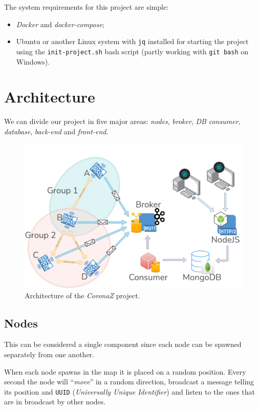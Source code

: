 \documentclass[conference]{IEEEtran}
\begin{document}
		The system requirements for this project are simple:
		\begin{itemize}
			\item \textit{Docker} and \textit{docker-compose};
			\item Ubuntu or another Linux system with \texttt{jq} installed for starting the project using the \texttt{init-project.sh} bash script (partly working with \texttt{git bash} on Windows).
		\end{itemize}

\section{Architecture}\label{sec:architecture}
	
	We can divide our project in five major areas: \textit{nodes}, \textit{broker}, \textit{DB consumer}, \textit{database}, \textit{back-end} and \textit{front-end}.

	\begin{figure}[htbp]
		\centerline{\includegraphics[width=\linewidth]{img/coronaz.png}}
		\caption{Architecture of the \textit{CoronaZ} project.}
		\label{fig:architecture}
	\end{figure}
	
	\subsection{Nodes}
	
		This can be considered a single component since each node can be spawned separately from one another.
		
		When each node spawns in the map it is placed on a random position.
		Every second the node will ``\textit{move}'' in a random direction, broadcast a message telling its position and \texttt{UUID} (\textit{Universally Unique Identifier}) and listen to the ones that are in broadcast by other nodes.
		
\end{document}
